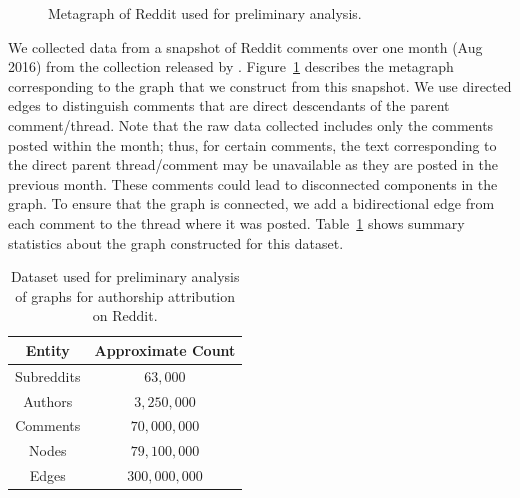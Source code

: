 \begin{figure}
\begin{subfigure}{0.64\linewidth}
{
        }
    \end{subfigure}
    \centering
    \caption{Metagraph of Reddit used for preliminary analysis.}
    \label{fig:future_work:scale:preliminary:reddit_meta}
\end{figure}
We collected data from a snapshot of Reddit comments over one month (Aug 2016) from the collection released by \citet{baumgartner2020pushshift}.
Figure~\ref*{fig:future_work:scale:preliminary:reddit_meta} describes the metagraph corresponding to the graph that we construct from this snapshot.
We use directed edges to distinguish comments that are direct descendants of the parent comment/thread. 
Note that the raw data collected includes only the comments posted within the month; thus, for certain comments, the text corresponding to the direct parent thread/comment may be unavailable as they are posted in the previous month. 
These comments could lead to disconnected components in the graph.
To ensure that the graph is connected, we add a bidirectional edge from each comment to the thread where it was posted.
Table~\ref*{tab:future_work:scale:preliminary:reddit_stats} shows summary statistics about the graph constructed for this dataset.

\begin{table}
    \centering
    \begin{tabular}{cc}
        \toprule
        Entity & Approximate Count \\
        \midrule 
        Subreddits &  $63,000$ \\
        Authors & $3,250,000$ \\
        Comments & $70,000,000$ \\
        Nodes & $79,100,000$ \\
        Edges & $300,000,000$\\
        \bottomrule
    \end{tabular}
    \caption{Dataset used for preliminary analysis of graphs for authorship attribution on Reddit.}
    \label{tab:future_work:scale:preliminary:reddit_stats}
\end{table}

